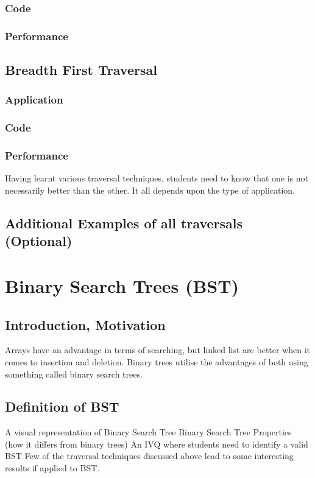 \documentclass[12pt,a4paper]{article}
\begin{document}
\subsubsection{Code}

\subsubsection{Performance}

\subsection{Breadth First Traversal}
\subsubsection{Application}

\subsubsection{Code}

\subsubsection{Performance}

Having learnt various traversal techniques, students need to know that one is not necessarily better than the other. It all depends upon the type of application. 

\subsection{Additional Examples of all traversals (Optional)}

\section{Binary Search Trees (BST)}
\subsection{Introduction, Motivation}
Arrays have an advantage in terms of searching, but linked list are better when it comes to insertion and deletion. Binary trees utilise the advantages of both using something called binary search trees. 

\subsection{Definition of BST}
A visual representation of Binary Search Tree
Binary Search Tree Properties (how it differs from binary trees)
An IVQ where students need to identify a valid BST
Few of the traversal techniques discussed above lead to some interesting results if applied to BST.
\end{document}
